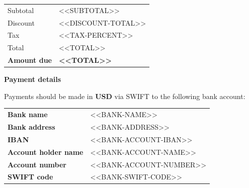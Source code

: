 \documentclass[letterpaper]{article}
\begin{document}
\vspace{10pt}

\hfill
\begin{tabularx}{0.5\textwidth}{l >{\raggedleft\arraybackslash}X}
    Subtotal                    & <<SUBTOTAL>>              \\
    \arrayrulecolor{offwhite}\hline
    Discount                    & <<DISCOUNT-TOTAL>>        \\
    \hline
    Tax                         & <<TAX-PERCENT>>           \\
    \hline
    Total                       & <<TOTAL>>                 \\
    \hline
    \large\textbf{Amount due}   & \large\textbf{<<TOTAL>>}
\end{tabularx}

\vspace{2em}
\vfill

\LARGE\textbf{Payment details}\vspace{0.2em}

\normalsize{Payments should be made in \textbf{USD} via SWIFT to the following bank account:}

\begin{tabular}{@{}l l}
\textbf{Bank name}              & <<BANK-NAME>> \\
\textbf{Bank address}           & <<BANK-ADDRESS>> \\
\textbf{IBAN}                   & <<BANK-ACCOUNT-IBAN>> \\ %
\textbf{Account holder name}    & <<BANK-ACCOUNT-NAME>> \\
\textbf{Account number}         & <<BANK-ACCOUNT-NUMBER>> \\
\textbf{SWIFT code}             & <<BANK-SWIFT-CODE>>
\end{tabular}

\vspace{10pt}
\end{document}
